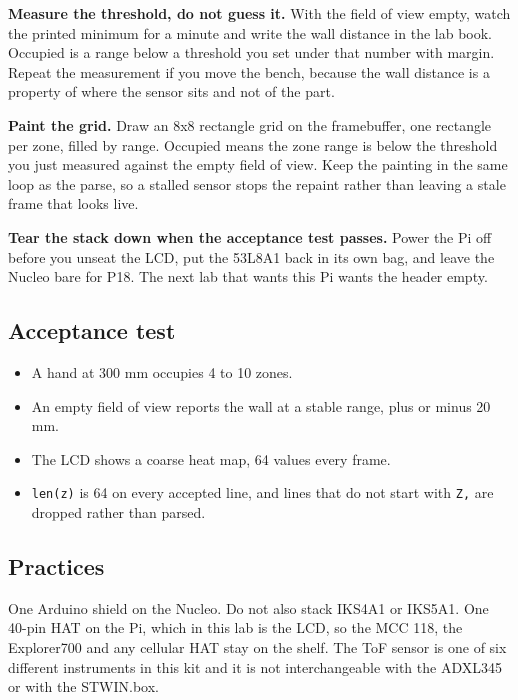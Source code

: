 \begin{steps}
\item \textbf{Measure the threshold, do not guess it.} With the field of view empty, watch
the printed minimum for a minute and write the wall distance in the lab book. Occupied is
a range below a threshold you set under that number with margin. Repeat the measurement if
you move the bench, because the wall distance is a property of where the sensor sits and
not of the part.

\item \textbf{Paint the grid.} Draw an 8x8 rectangle grid on the framebuffer, one rectangle
per zone, filled by range. Occupied means the zone range is below the threshold you just
measured against the empty field of view. Keep the painting in the same loop as the parse,
so a stalled sensor stops the repaint rather than leaving a stale frame that looks live.

\item \textbf{Tear the stack down when the acceptance test passes.} Power the Pi off before
you unseat the LCD, put the 53L8A1 back in its own bag, and leave the Nucleo bare for P18.
The next lab that wants this Pi wants the header empty.
\end{steps}

\subsection*{Acceptance test}

\begin{itemize}
\item A hand at 300 mm occupies 4 to 10 zones.
\item An empty field of view reports the wall at a stable range, plus or minus 20 mm.
\item The LCD shows a coarse heat map, 64 values every frame.
\item \texttt{len(z)} is 64 on every accepted line, and lines that do not start with
\texttt{Z,} are dropped rather than parsed.
\end{itemize}

\subsection*{Practices}

One Arduino shield on the Nucleo. Do not also stack IKS4A1 or IKS5A1. One 40-pin HAT on
the Pi, which in this lab is the LCD, so the MCC 118, the Explorer700 and any cellular HAT
stay on the shelf. The ToF sensor is one of six different instruments in this kit and it is
not interchangeable with the ADXL345 or with the STWIN.box.

